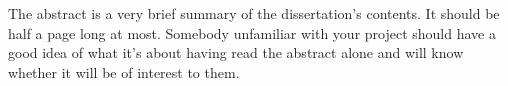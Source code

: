 The abstract is a very brief summary of the dissertation's contents. It should be half a page long at most. Somebody unfamiliar with your project should have a good idea of what it's about having read the abstract alone and will know whether it will be of interest to them.



